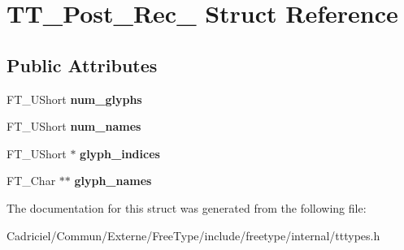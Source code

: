 \hypertarget{struct_t_t___post__20_rec__}{}\section{T\+T\+\_\+\+Post\+\_\+Rec\+\_\+ Struct Reference}
\label{struct_t_t___post__20_rec__}
\subsection*{Public Attributes}
\begin{DoxyCompactItemize}
\item 
F\+T\+\_\+\+U\+Short {\bfseries num\+\_\+glyphs}\hypertarget{struct_t_t___post__20_rec___ae3de3677810e6581f2c197e8fa902979}{}\label{struct_t_t___post__20_rec___ae3de3677810e6581f2c197e8fa902979}

\item 
F\+T\+\_\+\+U\+Short {\bfseries num\+\_\+names}\hypertarget{struct_t_t___post__20_rec___af726ff4997521c76de36f76e1203e2b1}{}\label{struct_t_t___post__20_rec___af726ff4997521c76de36f76e1203e2b1}

\item 
F\+T\+\_\+\+U\+Short $\ast$ {\bfseries glyph\+\_\+indices}\hypertarget{struct_t_t___post__20_rec___a7f0a07ab96ccbe2597378f7aa2de3f8c}{}\label{struct_t_t___post__20_rec___a7f0a07ab96ccbe2597378f7aa2de3f8c}

\item 
F\+T\+\_\+\+Char $\ast$$\ast$ {\bfseries glyph\+\_\+names}\hypertarget{struct_t_t___post__20_rec___a8330fbc7db3659ac621e98d7ceb8aad3}{}\label{struct_t_t___post__20_rec___a8330fbc7db3659ac621e98d7ceb8aad3}

\end{DoxyCompactItemize}


The documentation for this struct was generated from the following file\+:\begin{DoxyCompactItemize}
\item 
Cadriciel/\+Commun/\+Externe/\+Free\+Type/include/freetype/internal/tttypes.\+h\end{DoxyCompactItemize}
